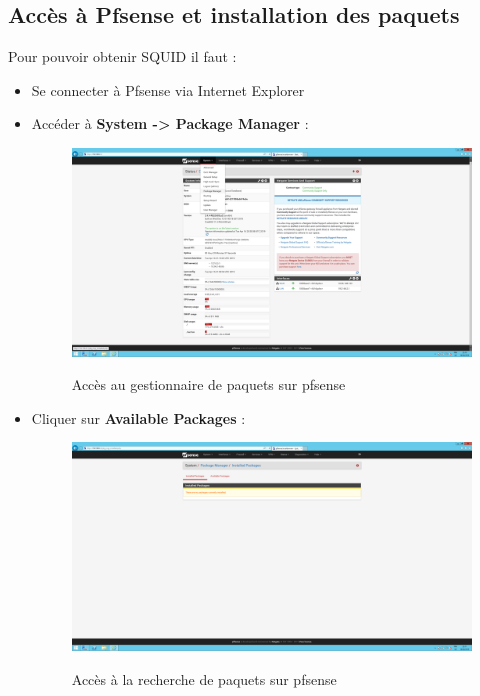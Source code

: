 \newpage
\subsection{Accès à Pfsense et installation des paquets}
Pour pouvoir obtenir SQUID il faut :
\begin{itemize}
    \item Se connecter à Pfsense via Internet Explorer
    \item Accéder à \textbf{System -> Package Manager} :
\begin{figure}[h!]
    \begin{center}
        \includegraphics[scale=0.22]{Pfsense_Screeshots/interception/3.png}
        \label{Pfsense_Screeshots/interception/3}
        \caption{Accès au gestionnaire de paquets sur pfsense}
    \end{center}
\end{figure}
\FloatBarrier 

    \item Cliquer sur \textbf{Available Packages} :
\begin{figure}[h!]
    \begin{center}
        \includegraphics[scale=0.22]{Pfsense_Screeshots/interception/4.png}
        \label{Pfsense_Screeshots/interception/4}
        \caption{Accès à la recherche de paquets sur pfsense}
    \end{center}
\end{figure}
\FloatBarrier 
    

\end{itemize}
